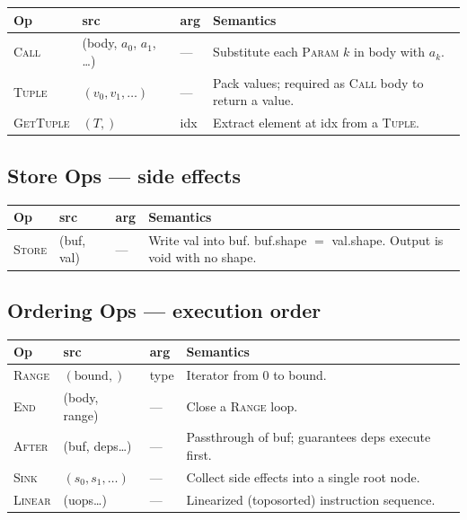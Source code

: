 \documentclass[10pt,letterpaper]{article}
\newcommand{\op}[1]{\textsc{#1}}
\begin{document}
\begin{tabular}{@{}l l l l@{}}
\toprule
\textbf{Op} & \textbf{src} & \textbf{arg} & \textbf{Semantics} \\
\midrule
\op{Call} & (body, $a_0$, $a_1$, \ldots) & --- & Substitute each \op{Param} $k$ in body with $a_k$. \\
\op{Tuple} & $(v_0, v_1, \ldots)$ & --- & Pack values; required as \op{Call} body to return a value. \\
\op{GetTuple} & $(T,)$ & idx & Extract element at idx from a \op{Tuple}. \\
\bottomrule
\end{tabular}

\subsection*{{\color{multipurple}Store Ops} \normalfont\small--- side effects}

\begin{tabular}{@{}l l l l@{}}
\toprule
\textbf{Op} & \textbf{src} & \textbf{arg} & \textbf{Semantics} \\
\midrule
\op{Store} & (buf, val) & --- & Write val into buf. buf.shape $=$ val.shape. Output is void with no shape. \\
\bottomrule
\end{tabular}

\subsection*{{\color{assignbrown}Ordering Ops} \normalfont\small--- execution order}

\begin{tabular}{@{}l l l l@{}}
\toprule
\textbf{Op} & \textbf{src} & \textbf{arg} & \textbf{Semantics} \\
\midrule
\op{Range} & $(\text{bound},)$ & type & Iterator from $0$ to bound. \\
\op{End} & (body, range) & --- & Close a \op{Range} loop. \\
\op{After} & (buf, deps\ldots) & --- & Passthrough of buf; guarantees deps execute first. \\
\op{Sink} & $(s_0, s_1, \ldots)$ & --- & Collect side effects into a single root node. \\
\op{Linear} & (uops\ldots) & --- & Linearized (toposorted) instruction sequence. \\
\bottomrule
\end{tabular}
\end{document}
